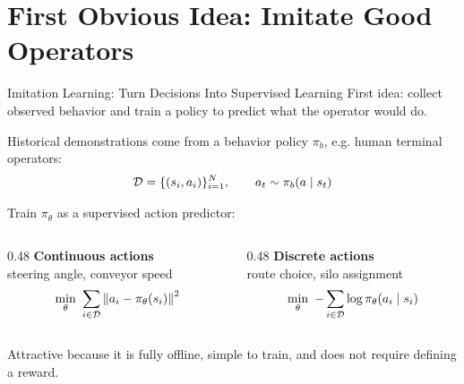\section{First Obvious Idea: Imitate Good Operators}

\begin{frame}{Imitation Learning: Turn Decisions Into Supervised Learning}
  First idea: collect observed behavior and train a policy to predict what the operator would do.

  \vspace{0.12cm}
  Historical demonstrations come from a \alert{behavior policy} $\pi_b$, e.g. human terminal operators:
  \[
    \mathcal D = \{(s_i,a_i)\}_{i=1}^N,
    \qquad
    a_t \sim \pi_b(a\mid s_t)
  \]

  \vspace{0.02cm}
  Train $\pi_\theta$ as a supervised action predictor:
  \begin{columns}[T,onlytextwidth]
    \begin{column}{0.48\textwidth}
      \textbf{Continuous actions}\\[-0.1cm]
      {\small steering angle, conveyor speed}
      \[
        \min_\theta\
        \sum_{i\in\mathcal D}
        \left\|a_i-\pi_\theta(s_i)\right\|^2
      \]
    \end{column}
    \begin{column}{0.48\textwidth}
      \textbf{Discrete actions}\\[-0.1cm]
      {\small route choice, silo assignment}
      \[
        \min_\theta\
        -\sum_{i\in\mathcal D}
        \log \pi_\theta(a_i\mid s_i)
      \]
    \end{column}
  \end{columns}

  \vspace{0.1cm}
  Attractive because it is fully offline, simple to train, and does not require defining a reward.
\end{frame}

